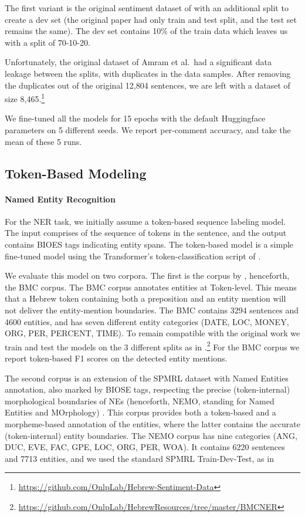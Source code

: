 \documentclass[11pt,a4paper]{article}
\begin{document}
The first variant is the original sentiment dataset of \citet{amram2018} with an additional split to create a dev set (the original paper had only train and test split, and the test set remains the same). The dev set contains 10\% of the train data  which leaves us with a split of 70-10-20. 

Unfortunately, the original dataset of Amram et al.\ had  a significant data leakage between the splits, with  duplicates in the data samples. After removing the duplicates out of the original 12,804 sentences, we are left with a dataset of size 8,465.\footnote{\url{https://github.com/OnlpLab/Hebrew-Sentiment-Data}} 


We fine-tuned all the models for 15 epochs with the default Huggingface \cite{wolf-etal-2020-transformers} parameters on 5 different seeds. We report per-comment accuracy, and take the mean of these 5 runs.




\subsection{Token-Based  Modeling}

\paragraph{Named Entity Recognition}
For the NER task, we initially assume a token-based sequence labeling model. The input comprises of the sequence of tokens in the sentence, and the output contains  BIOES tags indicating entity spans. 
The token-based model is a simple fine-tuned model using the Transformer's token-classification script of \citet{wolf-etal-2020-transformers}. 


We evaluate this model on two corpora. The first is the corpus by \citet{bmcner}, henceforth, the BMC corpus. 
The BMC corpus annotates entities at Token-level. This means that a Hebrew token containing both a preposition and an entity mention will not deliver the entity-mention boundaries. The BMC contains 3294 sentences and 4600 entities, and has seven different entity categories (DATE, LOC, MONEY, ORG, PER, PERCENT, TIME). To remain compatible with the original work we train and test the models on the 3 different splits as in \citet{nemo}.\footnote{\url{https://github.com/OnlpLab/HebrewResources/tree/master/BMCNER}} 
For the BMC corpus we report token-based  F1 scores on the detected entity mentions.

The second corpus is an extension of the SPMRL dataset with Named Entities annotation, also marked by BIOSE tags, respecting the precise (token-internal) morphological boundaries of NEs  (henceforth, NEMO, standing for Named Entities and MOrphology) \cite{nemo}. This corpus provides both a token-based and a morpheme-based annotation of the entities, where the latter contains the accurate (token-internal) entity boundaries. The NEMO corpus has nine categories (ANG, DUC, EVE, FAC, GPE, LOC, ORG, PER, WOA).   It contains 6220 sentences and 7713 entities, and  we used the standard SPMRL Train-Dev-Test, as in \citet{nemo}  
\end{document}
